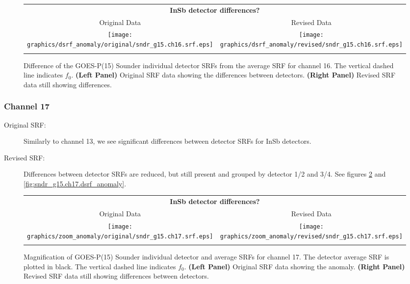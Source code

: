 \begin{figure}[htp]
  \centering
  \begin{tabular}{c c}
    \multicolumn{2}{c}{\textsf{\bfseries InSb detector differences?}} \\
    \hspace{1.5em}\textsf{Original Data} &
    \hspace{1.5em}\textsf{Revised Data} \\
    \texttt{[image: graphics/dsrf\_anomaly/original/sndr\_g15.ch16.srf.eps]} &
    \texttt{[image: graphics/dsrf\_anomaly/revised/sndr\_g15.ch16.srf.eps]} \\\\
  \end{tabular}
  \caption{Difference of the GOES-P(15) Sounder individual detector SRFs from the average SRF for channel 16. The vertical dashed line indicates $f_0$. \textbf{(Left Panel)} Original SRF data showing the differences between detectors. \textbf{(Right Panel)} Revised SRF data still showing differences.}
  \label{fig:sndr_g15.ch16.dsrf_anomaly}
\end{figure}

\subsubsection{Channel 17}
\begin{description}
  \item[Original SRF:] Similarly to channel 13, we see significant differences between detector SRFs for InSb detectors.
  \item[Revised SRF:]  Differences between detector SRFs are reduced, but still present and grouped by detector 1/2 and 3/4. See figures \ref{fig:sndr_g15.ch17.anomaly} and \ref{fig:sndr_g15.ch17.dsrf_anomaly}.
\end{description}

\begin{figure}[htp]
  \centering
  \begin{tabular}{c c}
    \multicolumn{2}{c}{\textsf{\bfseries InSb detector differences?}} \\
    \hspace{1.5em}\textsf{Original Data} &
    \hspace{1.5em}\textsf{Revised Data} \\
    \texttt{[image: graphics/zoom\_anomaly/original/sndr\_g15.ch17.srf.eps]} &
    \texttt{[image: graphics/zoom\_anomaly/revised/sndr\_g15.ch17.srf.eps]} \\\\
  \end{tabular}
  \caption{Magnification of GOES-P(15) Sounder individual detector and average SRFs for channel 17. The detector average SRF is plotted in black. The vertical dashed line indicates $f_0$. \textbf{(Left Panel)} Original SRF data showing the anomaly. \textbf{(Right Panel)} Revised SRF data still showing differences between detectors.}
  \label{fig:sndr_g15.ch17.anomaly}
\end{figure}

